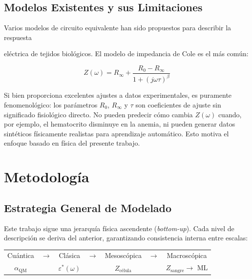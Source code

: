 \documentclass[12pt]{article}
\begin{document}
\subsection{Modelos Existentes y sus Limitaciones}

Varios modelos de circuito equivalente han sido propuestos para describir la respuesta

el\'ectrica de tejidos biol\'ogicos. El modelo de impedancia de Cole \citep{Cole1940} es el
m\'as com\'un:

\begin{equation}
Z(\omega) = R_\infty + \frac{R_0 - R_\infty}{1 + (j\omega\tau)^\beta}
\end{equation}

Si bien proporciona excelentes ajustes a datos experimentales, es puramente fenomenol\'ogico:
los par\'ametros $R_0$, $R_\infty$ y $\tau$ son coeficientes de ajuste sin significado fisiol\'ogico
directo. No pueden predecir c\'omo cambia $Z(\omega)$ cuando, por ejemplo, el
hematocrito disminuye en la anemia, ni pueden generar datos sint\'eticos f\'isicamente realistas
para aprendizaje autom\'atico. Esto motiva el enfoque basado en f\'isica del presente trabajo.


\section{Metodolog\'ia}

\label{sec:methods}


\subsection{Estrategia General de Modelado}

Este trabajo sigue una jerarqu\'ia f\'isica ascendente (\textit{bottom-up}). Cada nivel de
descripci\'on se deriva del anterior, garantizando consistencia interna entre escalas:

\begin{center}

\renewcommand{\arraystretch}{1.3}
\begin{tabular}{@{}ccccccc@{}}
Cu\'antica & $\to$ & Cl\'asica & $\to$ & Mesosc\'opica & $\to$ & Macrosc\'opica \\
$\alpha_{\text{QM}}$ & & $\varepsilon^*(\omega)$ & &
$Z_{\text{c\'elula}}$ & & $Z_{\text{sangre}} \to$ ML
\end{tabular}
\end{center}
\end{document}
